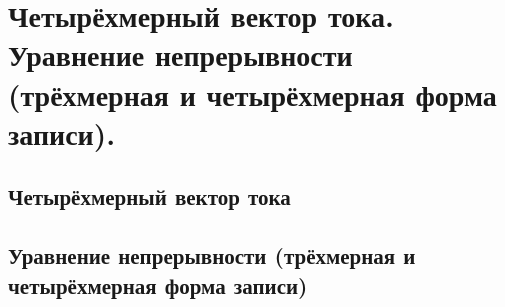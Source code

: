 \chapter{Четырёхмерный вектор тока. Уравнение непрерывности (трёхмерная 
и четырёхмерная форма записи).}

\section{Четырёхмерный вектор тока}
\section{Уравнение непрерывности (трёхмерная и четырёхмерная форма записи)}

